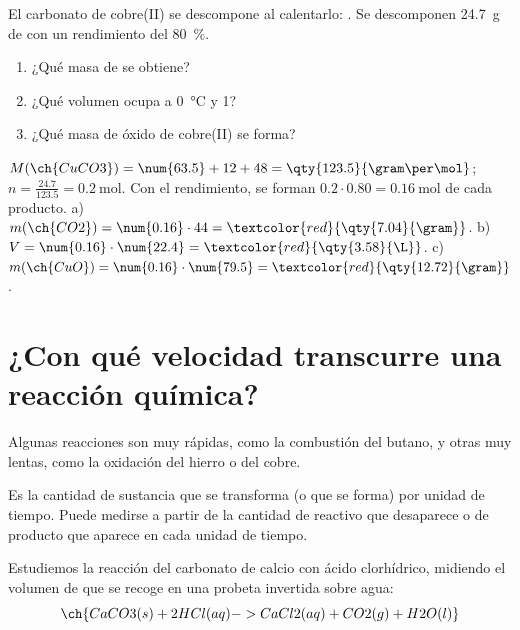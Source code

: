\begin{exercise}
    El carbonato de cobre(II) se descompone al calentarlo: . Se descomponen \qty{24.7}{\gram} de  con un rendimiento del \qty{80}{\percent}.
    \begin{enumerate}[label=\alph*)]
        \item ¿Qué masa de  se obtiene?
        \item ¿Qué volumen ocupa a \qty{0}{\celsius} y \qty{1}{\atm}?
        \item ¿Qué masa de óxido de cobre(II) se forma?
    \end{enumerate}
    \begin{solu}
        \(M(\ch{CuCO3}) = \num{63.5} + 12 + 48 = \qty{123.5}{\gram\per\mol}\); \(n = \frac{\num{24.7}}{\num{123.5}} = \qty{0.2}{\mol}\). Con el rendimiento, se forman \(\num{0.2} \cdot \num{0.80} = \qty{0.16}{\mol}\) de cada producto.
        a) \(m(\ch{CO2}) = \num{0.16} \cdot 44 = \textcolor{red}{\qty{7.04}{\gram}}\). b) \(V = \num{0.16} \cdot \num{22.4} = \textcolor{red}{\qty{3.58}{\L}}\). c) \(m(\ch{CuO}) = \num{0.16} \cdot \num{79.5} = \textcolor{red}{\qty{12.72}{\gram}}\).
    \end{solu}
\end{exercise}

\section{¿Con qué velocidad transcurre una reacción química?}

Algunas reacciones son muy rápidas, como la combustión del butano, y otras muy lentas, como la oxidación del hierro o del cobre.

\begin{definition}
    Es la cantidad de sustancia que se transforma (o que se forma) por unidad de tiempo. Puede medirse a partir de la cantidad de reactivo que desaparece o de producto que aparece en cada unidad de tiempo.
\end{definition}

Estudiemos la reacción del carbonato de calcio con ácido clorhídrico, midiendo el volumen de  que se recoge en una probeta invertida sobre agua:
\[ \ch{CaCO3 (s) + 2 HCl (aq) -> CaCl2 (aq) + CO2 (g) + H2O (l)} \]

